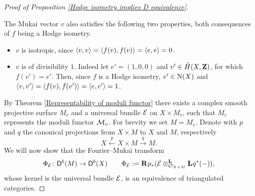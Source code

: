 \begin{proof}[Proof of Proposition \ref{Hodge isometry implies D equivalence}]
\begin{itemize}[label = $\circ$]
    \end{itemize} 
    The Mukai vector $v$ also satisfies the following two properties, both consequences of $f$ being a Hodge isometry.
    \begin{itemize}[label = $\vartriangleright$]
        \item{$v$ is isotropic, since $\pairing{v}{v} = \pairing{f(v)}{f(v)} = \pairing{e}{e} = 0$.}
        \item {$v$ is of divisibility $1$. Indeed let $e' = (1, 0, 0)$ and $v'\in \mukai{X}$, for which $f(v') = e'$. Then, since $f$ is a Hodge isometry, $v' \in \extendedNS{X}$ and $\pairing{v}{v'} = \pairing{f(v)}{f(v')} = \pairing{e}{e'} = 1$.
        }
    \end{itemize}
    By Theorem \ref{Representability of moduli functor} there exists a complex smooth projective surface $M_v$ and a universal bundle $\E$ on $X \times M_v$, such that $M_v$ represents the moduli functor $\M_v$. For brevity we set $M = M_v$. Denote with $p$ and $q$ the canonical projections from $X \times M$ to $X$ and $M$, respectively
    \[
        X \xleftarrow{\ p \ } X \times M \xrightarrow{\ q \ } M.
    \]
    We will now show that the Fourier--Mukai transform 
    \[
        \fm{\E} \colon \derb{M} \to \derb{X} \qquad \fm{\E} := \rderived{}{p_*}(\derivedtensor{\E}{\lderived{}{q^*}(-)}{\struct{X \times M}}),
    \]
    whose kernel is the universal bundle $\E$, is an equivalence of triangulated categories. 


\end{proof}
